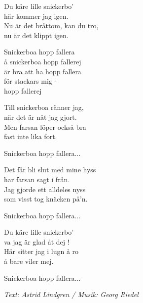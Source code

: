 \vspace{10pt}
Du käre lille snickerbo'\\
här kommer jag igen.\\
Nu är det bråttom, kan du tro,\\
nu är det klippt igen.\par
\vspace{6pt}
Snickerboa hopp fallera\\
å snickerboa hopp fallerej\\
är bra att ha hopp fallera\\
för stackars mig -\\
hopp fallerej\par
\vspace{6pt}
Till snickerboa ränner jag,\\
när det är nåt jag gjort.\\
Men farsan löper också bra\\
fast inte lika fort.\par
\vspace{6pt}
Snickerboa hopp fallera...\par
\vspace{6pt}
Det får bli slut med mine hyss\\
har farsan sagt i från.\\
Jag gjorde ett alldeles nyss\\
som visst tog knäcken på'n.\par
\vspace{6pt}
Snickerboa hopp fallera...\par
\vspace{6pt}
Du käre lille snickerbo'\\
va jag är glad åt dej !\\
Här sitter jag i lugn å ro\\
å bare viler mej.\par
\vspace{6pt}
Snickerboa hopp fallera...\par
\vspace{10pt}
{\footnotesize\textit{Text: Astrid Lindgren / Musik: Georg Riedel}}
